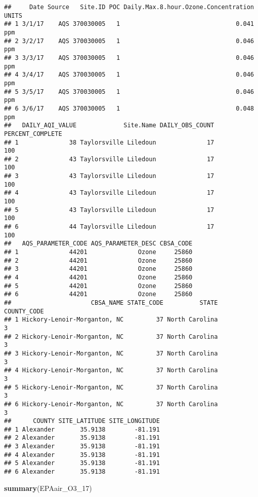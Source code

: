 \documentclass[]{article}
\newenvironment{Shaded}{\begin{snugshade}}{\end{snugshade}}
\newcommand{\KeywordTok}[1]{\textcolor[rgb]{0.13,0.29,0.53}{\textbf{#1}}}
\newcommand{\DecValTok}[1]{\textcolor[rgb]{0.00,0.00,0.81}{#1}}
\newcommand{\NormalTok}[1]{#1}
\begin{document}
\begin{verbatim}
##     Date Source   Site.ID POC Daily.Max.8.hour.Ozone.Concentration UNITS
## 1 3/1/17    AQS 370030005   1                                0.041   ppm
## 2 3/2/17    AQS 370030005   1                                0.046   ppm
## 3 3/3/17    AQS 370030005   1                                0.046   ppm
## 4 3/4/17    AQS 370030005   1                                0.046   ppm
## 5 3/5/17    AQS 370030005   1                                0.046   ppm
## 6 3/6/17    AQS 370030005   1                                0.048   ppm
##   DAILY_AQI_VALUE             Site.Name DAILY_OBS_COUNT PERCENT_COMPLETE
## 1              38 Taylorsville Liledoun              17              100
## 2              43 Taylorsville Liledoun              17              100
## 3              43 Taylorsville Liledoun              17              100
## 4              43 Taylorsville Liledoun              17              100
## 5              43 Taylorsville Liledoun              17              100
## 6              44 Taylorsville Liledoun              17              100
##   AQS_PARAMETER_CODE AQS_PARAMETER_DESC CBSA_CODE
## 1              44201              Ozone     25860
## 2              44201              Ozone     25860
## 3              44201              Ozone     25860
## 4              44201              Ozone     25860
## 5              44201              Ozone     25860
## 6              44201              Ozone     25860
##                      CBSA_NAME STATE_CODE          STATE COUNTY_CODE
## 1 Hickory-Lenoir-Morganton, NC         37 North Carolina           3
## 2 Hickory-Lenoir-Morganton, NC         37 North Carolina           3
## 3 Hickory-Lenoir-Morganton, NC         37 North Carolina           3
## 4 Hickory-Lenoir-Morganton, NC         37 North Carolina           3
## 5 Hickory-Lenoir-Morganton, NC         37 North Carolina           3
## 6 Hickory-Lenoir-Morganton, NC         37 North Carolina           3
##      COUNTY SITE_LATITUDE SITE_LONGITUDE
## 1 Alexander       35.9138        -81.191
## 2 Alexander       35.9138        -81.191
## 3 Alexander       35.9138        -81.191
## 4 Alexander       35.9138        -81.191
## 5 Alexander       35.9138        -81.191
## 6 Alexander       35.9138        -81.191
\end{verbatim}

\begin{Shaded}
\begin{Highlighting}[]
\KeywordTok{summary}\NormalTok{(EPAair_O3_}\DecValTok{17}\NormalTok{)}
\end{Highlighting}
\end{Shaded}
\end{document}
